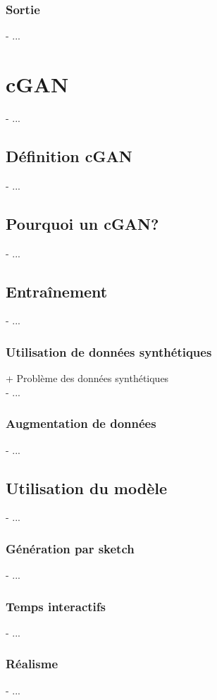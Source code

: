 \subsubsection{Sortie}
- ...
\section{cGAN}
- ...
\subsection{Définition cGAN}
- ...
\subsection{Pourquoi un cGAN?}
- ...
\subsection{Entraînement}
- ...
\subsubsection{Utilisation de données synthétiques}
+ Problème des données synthétiques \\
- ...
\subsubsection{Augmentation de données}
- ...
\subsection{Utilisation du modèle}
- ...
\subsubsection{Génération par sketch}
- ...
\subsubsection{Temps interactifs}
- ...
\subsubsection{Réalisme}
- ...

